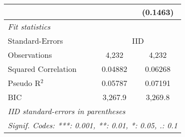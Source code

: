 \begin{tabular}{lcc}
                                         &                & (0.1463)\\   
   \midrule
   \emph{Fit statistics}\\
   Standard-Errors & \multicolumn{2}{c}{IID} \\ 
   Observations                          & 4,232          & 4,232\\  
   Squared Correlation                   & 0.04882        & 0.06268\\  
   Pseudo R$^2$                          & 0.05787        & 0.07191\\  
   BIC                                   & 3,267.9        & 3,269.8\\  
   \midrule \midrule
   \multicolumn{3}{l}{\emph{IID standard-errors in parentheses}}\\
   \multicolumn{3}{l}{\emph{Signif. Codes: ***: 0.001, **: 0.01, *: 0.05, .: 0.1}}\\
\end{tabular}
\par\endgroup


